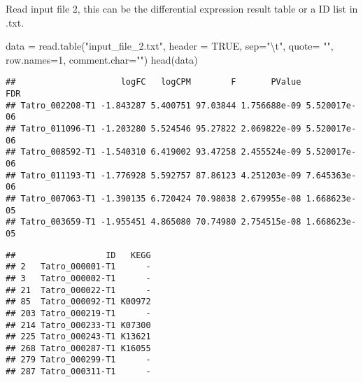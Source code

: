\documentclass[
]{article}
\newenvironment{Shaded}{\begin{snugshade}}{\end{snugshade}}
\newcommand{\AttributeTok}[1]{\textcolor[rgb]{0.77,0.63,0.00}{#1}}
\newcommand{\ConstantTok}[1]{\textcolor[rgb]{0.00,0.00,0.00}{#1}}
\newcommand{\DecValTok}[1]{\textcolor[rgb]{0.00,0.00,0.81}{#1}}
\newcommand{\FunctionTok}[1]{\textcolor[rgb]{0.00,0.00,0.00}{#1}}
\newcommand{\NormalTok}[1]{#1}
\newcommand{\OtherTok}[1]{\textcolor[rgb]{0.56,0.35,0.01}{#1}}
\newcommand{\SpecialCharTok}[1]{\textcolor[rgb]{0.00,0.00,0.00}{#1}}
\newcommand{\StringTok}[1]{\textcolor[rgb]{0.31,0.60,0.02}{#1}}
\begin{document}
Read input file 2, this can be the differential expression result table
or a ID list in .txt.

\begin{Shaded}
\begin{Highlighting}[]
\NormalTok{data }\OtherTok{=} \FunctionTok{read.table}\NormalTok{(}\StringTok{"input\_file\_2.txt"}\NormalTok{, }\AttributeTok{header =} \ConstantTok{TRUE}\NormalTok{, }\AttributeTok{sep=}\StringTok{"}\SpecialCharTok{\textbackslash{}t}\StringTok{"}\NormalTok{,  }\AttributeTok{quote=} \StringTok{""}\NormalTok{, }\AttributeTok{row.names=}\DecValTok{1}\NormalTok{, }\AttributeTok{comment.char=}\StringTok{""}\NormalTok{)}
\FunctionTok{head}\NormalTok{(data)}
\end{Highlighting}
\end{Shaded}

\begin{verbatim}
##                     logFC   logCPM        F       PValue          FDR
## Tatro_002208-T1 -1.843287 5.400751 97.03844 1.756688e-09 5.520017e-06
## Tatro_011096-T1 -1.203280 5.524546 95.27822 2.069822e-09 5.520017e-06
## Tatro_008592-T1 -1.540310 6.419002 93.47258 2.455524e-09 5.520017e-06
## Tatro_011193-T1 -1.776928 5.592757 87.86123 4.251203e-09 7.645363e-06
## Tatro_007063-T1 -1.390135 6.720424 70.98038 2.679955e-08 1.668623e-05
## Tatro_003659-T1 -1.955451 4.865080 70.74980 2.754515e-08 1.668623e-05
\end{verbatim}

\begin{Shaded}
\end{Shaded}

\begin{verbatim}
##                  ID   KEGG
## 2   Tatro_000001-T1      -
## 3   Tatro_000002-T1      -
## 21  Tatro_000022-T1      -
## 85  Tatro_000092-T1 K00972
## 203 Tatro_000219-T1      -
## 214 Tatro_000233-T1 K07300
## 225 Tatro_000243-T1 K13621
## 268 Tatro_000287-T1 K16055
## 279 Tatro_000299-T1      -
## 287 Tatro_000311-T1      -
\end{verbatim}
\end{document}
